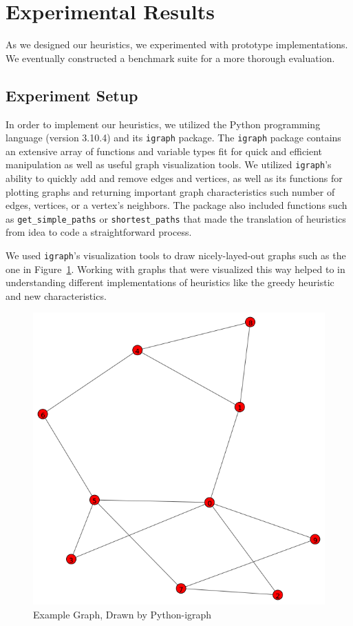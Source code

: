 \documentclass[twocolumn,showpacs,%
  nofootinbib,aps,superscriptaddress,%
  eqsecnum,prd,notitlepage,showkeys,11pt]{article}
\begin{document}
\section{Experimental Results}

As we designed our heuristics, we experimented with prototype implementations. We eventually constructed a benchmark suite for a more thorough evaluation.

\subsection{Experiment Setup}

In order to implement our heuristics, we utilized the Python programming language (version 3.10.4) and its \texttt{igraph} package. The \texttt{igraph} package contains an extensive array of functions and variable types fit for quick and efficient manipulation as well as useful graph visualization tools. We utilized \texttt{igraph}'s ability to quickly add and remove edges and vertices, as well as its functions for plotting graphs and returning important graph characteristics such number of edges, vertices, or a vertex's neighbors. The package also included functions such as \verb+get_simple_paths+ or \verb+shortest_paths+ that made the translation of heuristics from idea to code a straightforward process.

We used \texttt{igraph}'s visualization tools to draw nicely-layed-out graphs such as the one in Figure~\ref{fig:ExampleGraph}.  Working with graphs that were visualized this way helped to in understanding different implementations of heuristics like the greedy heuristic and new characteristics.

\begin{figure}
    \centering
    \includegraphics[width=0.8\linewidth]{examplegraph.png}
    \caption{Example Graph, Drawn by Python-igraph}
    \label{fig:ExampleGraph}
\end{figure}
\end{document}
